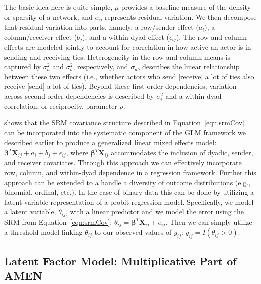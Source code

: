 The basic idea here is quite simple, $\mu$ provides a baseline measure of the density or sparsity of a network, and $e_{ij}$ represents residual variation. We then decompose that residual variation into parts, namely, a row/sender effect ($a_{i}$), a column/receiver effect ($b_{j}$), and a within dyad effect ($\epsilon_{ij}$). The row and column effects are modeled jointly to account for correlation in how active an actor is in sending and receiving ties. Heterogeneity in the row and column means is captured by $\sigma_{a}^{2}$ and $\sigma_{b}^{2}$, respectively, and $\sigma_{ab}$ describes the linear relationship between these two effects (i.e., whether actors who send [receive] a lot of ties also receive [send] a lot of ties). Beyond these first-order dependencies, variation across second-order dependencies is described by $\sigma_{\epsilon}^{2}$ and a within dyad correlation, or reciprocity, parameter $\rho$. 

\citet{hoff:2005} shows that the SRM covariance structure described in Equation~\ref{eqn:srmCov} can be incorporated into the systematic component of the GLM framework we described earlier to produce a generalized linear mixed effects model: $\bm\beta^{T} \mathbf{X}_{ij} + a_{i} + b_{j} + \epsilon_{ij}$, where $ \bm\beta^{T} \mathbf{X}_{ij}$ accommodates the inclusion of dyadic, sender, and receiver covariates. Through this approach we can effectively incorporate row, column, and within-dyad dependence in a regression framework. Further this approach can be extended to a handle a diversity of outcome distributions (e.g., binomial, ordinal, etc.). In the case of binary data this can be done by utilizing a latent variable representation of a probit regression model. Specifically, we model a latent variable, $\theta_{ij}$, with a linear predictor and we model the error using the SRM from Equation~\ref{eqn:srmCov}: $\theta_{ij} = \bm\beta^{T} \mathbf{X}_{ij} + e_{ij}$. Then we can simply utilize a threshold model linking $\theta_{ij}$ to our observed values of $y_{ij}$: $y_{ij} = I(\theta_{ij}>0)$. 


\subsection{Latent Factor Model: Multiplicative Part of AMEN}

